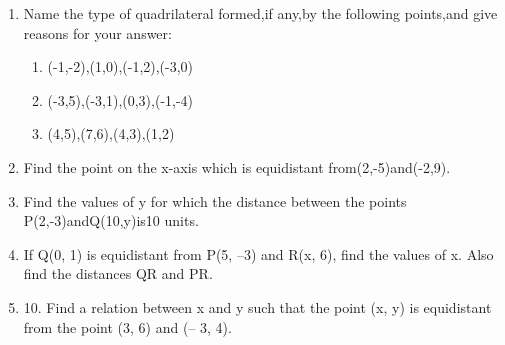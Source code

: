 \documentclass[12pt]{article}
\begin{document}
\begin{enumerate}
\item Name the type of quadrilateral formed,if any,by the following points,and give reasons for your answer:
\begin{enumerate}
\item (-1,-2),(1,0),(-1,2),(-3,0)
\item (-3,5),(-3,1),(0,3),(-1,-4)
\item (4,5),(7,6),(4,3),(1,2)
\end{enumerate}
\item Find the point on the x-axis which is equidistant from(2,-5)and(-2,9).
\item Find the values of y for which the distance between the points                  P(2,-3)andQ(10,y)is10 units.
\item  If Q(0, 1) is equidistant from P(5, –3) and R(x, 6), find the values of x. Also find the
distances QR and PR.
\item 10. Find a relation between x and y such that the point (x, y) is equidistant from the point
(3, 6) and (– 3, 4).

\end{enumerate}
\end{document}
